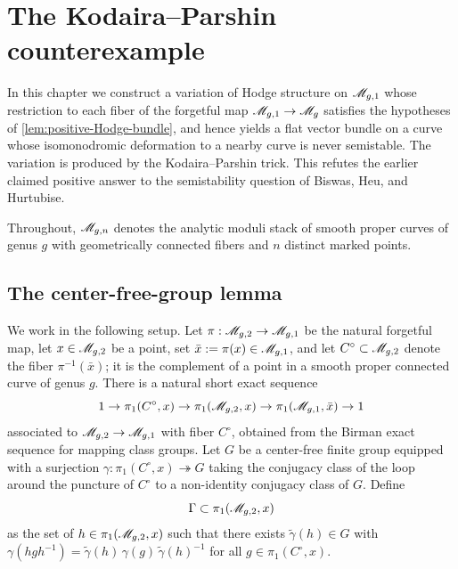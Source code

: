 \chapter{The Kodaira--Parshin counterexample}
\label{chap:counterexample}


In this chapter we construct a variation of Hodge structure on
\(\mathscr{M}_{g,1}\) whose restriction to each fiber of the forgetful map
\(\mathscr{M}_{g,1} \to \mathscr{M}_g\) satisfies the hypotheses of
\cref{lem:positive-Hodge-bundle}, and hence yields a flat vector bundle on a
curve whose isomonodromic deformation to a nearby curve is never semistable.
The variation is produced by the Kodaira--Parshin trick. This refutes the
earlier claimed positive answer to the semistability question of Biswas, Heu,
and Hurtubise.

Throughout, \(\mathscr{M}_{g,n}\) denotes the analytic moduli stack of smooth proper
curves of genus \(g\) with geometrically connected fibers and \(n\) distinct
marked points.

\section{The center-free-group lemma}

We work in the following setup. Let \(\pi : \mathscr{M}_{g,2} \to \mathscr{M}_{g,1}\) be the
natural forgetful map, let \(x \in \mathscr{M}_{g,2}\) be a point, set
\(\bar{x} := \pi(x) \in \mathscr{M}_{g,1}\), and let \(C^\circ \subset \mathscr{M}_{g,2}\)
denote the fiber \(\pi^{-1}(\bar{x})\); it is the complement of a point in a
smooth proper connected curve of genus \(g\). There is a natural short exact
sequence
\[
  1 \to \pi_1(C^\circ, x) \to \pi_1(\mathscr{M}_{g,2}, x) \to \pi_1(\mathscr{M}_{g,1}, \bar{x})
  \to 1
\]
associated to \(\mathscr{M}_{g,2} \to \mathscr{M}_{g,1}\) with fiber \(C^\circ\), obtained from
the Birman exact sequence for mapping class groups. Let \(G\) be a center-free
finite group equipped with a surjection
\(\gamma : \pi_1(C^\circ, x) \twoheadrightarrow G\) taking the conjugacy class of
the loop around the puncture of \(C^\circ\) to a non-identity conjugacy class of
\(G\). Define
\[
  \Gamma \subset \pi_1(\mathscr{M}_{g,2}, x)
\]
as the set of \(h \in \pi_1(\mathscr{M}_{g,2}, x)\) such that there exists
\(\widetilde{\gamma}(h) \in G\) with
\(\gamma(h g h^{-1}) = \widetilde{\gamma}(h)\, \gamma(g)\, \widetilde{\gamma}(h)^{-1}\)
for all \(g \in \pi_1(C^\circ, x)\).

